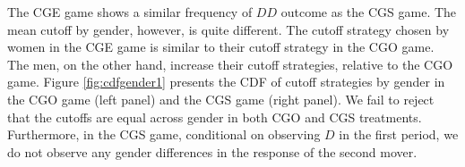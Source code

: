 \documentclass[12pt, letterpaper]{article}
\theoremstyle{plain}
\begin{document}
The CGE game shows a similar frequency of $DD$ outcome as the CGS game. The mean cutoff by gender, however, is quite different. The cutoff strategy chosen by women in the CGE game is similar to their cutoff strategy in the CGO game. The men, on the other hand, increase their cutoff strategies, relative to the CGO game. Figure \ref{fig:cdfgender1} presents the CDF of cutoff strategies by gender in the CGO game (left panel) and the CGS  game (right panel). We fail to reject that the cutoffs are equal across gender in both CGO and CGS treatments. Furthermore, in the CGS game, conditional on observing $D$ in the first period, we do not observe any gender differences in the response of the second mover. 
\begin{center}
\begin{figure}[ht]
\centering{}%
\begin{minipage}[t]{0.45\columnwidth}%
%
\end{minipage}%
\begin{minipage}[t]{0.45\columnwidth}%

\end{minipage}
\end{figure}
\end{center}
\end{document}
